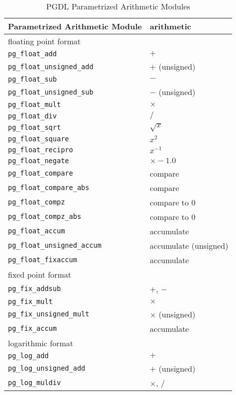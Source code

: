 \documentclass[times, 10pt,twocolumn]{article}
\begin{document}
\begin{table}
\caption{PGDL Parametrized Arithmetic Modules}
\begin{center}
\begin{tabular}{ll}
\hline
\hline
Parametrized Arithmetic Module &  arithmetic\\
\hline
floating point format & \\
 {\tt pg\_float\_add}           &  $+$\\
 {\tt pg\_float\_unsigned\_add} &  $+$ (unsigned)\\
 {\tt pg\_float\_sub}           &  $-$\\
 {\tt pg\_float\_unsigned\_sub} &  $-$ (unsigned)\\
 {\tt pg\_float\_mult}          &  $\times$\\
 {\tt pg\_float\_div}           &  $/$ \\
 {\tt pg\_float\_sqrt}          &  $\sqrt{x}$ \\
 {\tt pg\_float\_square}        &  $x^2$\\
 {\tt pg\_float\_recipro}       &  $x^{-1}$\\
 {\tt pg\_float\_negate}        &  $\times -1.0$\\
 {\tt pg\_float\_compare}       &  compare\\
 {\tt pg\_float\_compare\_abs}  &  compare\\
 {\tt pg\_float\_compz}         &  compare to 0\\
 {\tt pg\_float\_compz\_abs}    &  compare to 0\\
 {\tt pg\_float\_accum}         &  accumulate\\
 {\tt pg\_float\_unsigned\_accum}&  accumulate (unsigned)\\
 {\tt pg\_float\_fixaccum}      &  accumulate\\
fixed point format & \\
 {\tt pg\_fix\_addsub}          &  $+$, $-$\\
 {\tt pg\_fix\_mult}            &  $\times$\\
 {\tt pg\_fix\_unsigned\_mult}  &  $\times$ (unsigned)\\
 {\tt pg\_fix\_accum}           &  accumulate\\
logarithmic format& \\
 {\tt pg\_log\_add}             &  $+$\\
 {\tt pg\_log\_unsigned\_add}   &  $+$ (unsigned)\\
 {\tt pg\_log\_muldiv}          &  $\times$, $/$\\

\end{tabular}
\end{center}
\end{table}
\end{document}
